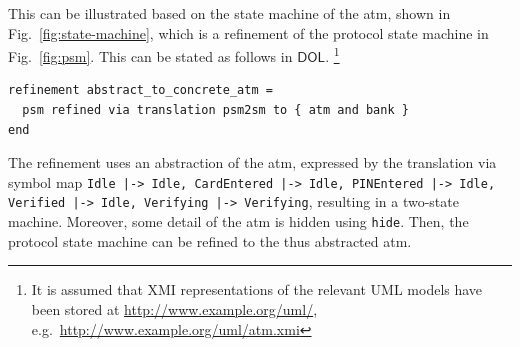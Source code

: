\documentclass[10pt, a4paper]{isov2}
\newcommand*{\syntax}[1]{\texttt{#1}}
\newcommand*{\DOL}{\ensuremath{\mathsf{DOL}}\xspace}
\newcommand{\uml}[1]{\textsf{#1}}
\begin{document}
 This can be illustrated based on the state
machine of the \uml{atm}, shown in Fig.~\ref{fig:state-machine}, which is a  
refinement of the protocol state machine in Fig.~\ref{fig:psm}. This can be stated as follows in \DOL. 
\footnote{  It is assumed that XMI representations of the relevant UML models have been 
stored at \url{http://www.example.org/uml/},
e.g.\ \url{http://www.example.org/uml/atm.xmi} } 


\begin{lstlisting}[basicstyle=\ttfamily,language=dolText,escapechar=@,mathescape]
refinement abstract_to_concrete_atm =
  psm refined via translation psm2sm to { atm and bank }
end
\end{lstlisting}

The refinement uses an abstraction of the \uml{atm}, expressed by the
translation via symbol map \texttt{Idle |-> Idle, CardEntered |-> Idle, PINEntered |-> Idle, Verified |-> Idle, Verifying |-> Verifying}, resulting in a two-state machine. Moreover, some detail of the \uml{atm} is hidden using
\syntax{hide}. Then, the protocol state machine can be refined to
the thus abstracted \uml{atm}.


\label{model-3}
	
\end{document}
